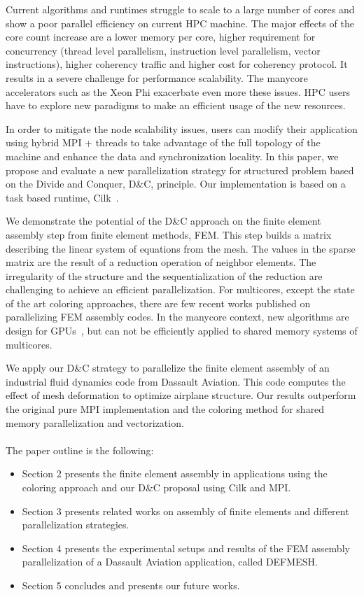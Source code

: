 \documentclass{IOS-Book-Article}
\begin{document}
Current algorithms and runtimes struggle to scale to a large number of cores and show a poor parallel efficiency on current HPC machine. 
The major effects of the core count increase are a lower memory per core, higher requirement for concurrency (thread level parallelism, instruction level parallelism, vector instructions),
higher coherency traffic and higher cost for coherency protocol.
It results in a severe challenge for performance scalability. The manycore accelerators such as the Xeon Phi exacerbate even more these issues.
HPC users have to explore new paradigms to make an efficient usage of the new resources. 

In order to mitigate the node scalability issues, users can modify their application using hybrid MPI + threads to take advantage of the full topology of the machine
and enhance the data and synchronization locality.
In this paper, we propose and evaluate a new parallelization strategy for structured problem based on the Divide and Conquer, D\&C, principle. Our implementation is based on a task based runtime,
Cilk~\cite{cilk5}. 

We demonstrate the potential of the D\&C approach on the finite element assembly step from finite element methods, FEM.
This step builds a matrix describing the linear system of equations from the mesh.
The values in the sparse matrix are the result of a reduction operation of neighbor elements.
The irregularity of the structure and the sequentialization of the reduction are challenging to achieve an efficient parallelization.
For multicores, except the state of the art coloring approaches, there are few recent works published on parallelizing FEM assembly codes.
In the manycore context, new algorithms are design for GPUs~\cite{cecka2011assembly,CPUGPUasm}, but can not be efficiently applied to shared memory systems of multicores.

We apply our D\&C strategy to parallelize the finite element assembly of an industrial fluid dynamics code from Dassault Aviation.
This code computes the effect of mesh deformation to optimize airplane structure.
Our results outperform the original pure MPI implementation and the coloring method for shared memory parallelization and vectorization.
\\\\
The paper outline is the following:
\begin{itemize}
\item Section 2 presents the finite element assembly in applications using the coloring approach and our D\&C proposal using Cilk and MPI.
\item Section 3 presents related works on assembly of finite elements and different parallelization strategies.
\item Section 4 presents the experimental setups and results of the FEM assembly parallelization of a Dassault Aviation application, called DEFMESH.
\item Section 5 concludes and presents our future works.
\end{itemize}
\end{document}
